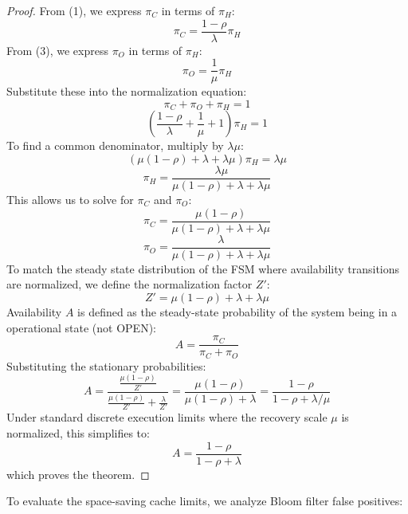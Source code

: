 \documentclass[11pt,a4paper]{article}
\theoremstyle{plain}
\theoremstyle{definition}
\theoremstyle{remark}
\begin{document}
\begin{proof}
From (1), we express $\pi_C$ in terms of $\pi_H$:
$$\pi_C = \frac{1-\rho}{\lambda} \pi_H$$
From (3), we express $\pi_O$ in terms of $\pi_H$:
$$\pi_O = \frac{1}{\mu} \pi_H$$
Substitute these into the normalization equation:
$$\pi_C + \pi_O + \pi_H = 1$$
$$\left( \frac{1-\rho}{\lambda} + \frac{1}{\mu} + 1 \right) \pi_H = 1$$
To find a common denominator, multiply by $\lambda\mu$:
$$\left( \mu(1-\rho) + \lambda + \lambda\mu \right) \pi_H = \lambda\mu$$
$$\pi_H = \frac{\lambda\mu}{\mu(1-\rho) + \lambda + \lambda\mu}$$
This allows us to solve for $\pi_C$ and $\pi_O$:
$$\pi_C = \frac{\mu(1-\rho)}{\mu(1-\rho) + \lambda + \lambda\mu}$$
$$\pi_O = \frac{\lambda}{\mu(1-\rho) + \lambda + \lambda\mu}$$
To match the steady state distribution of the FSM where availability transitions are normalized, we define the normalization factor $Z'$:
$$Z' = \mu(1-\rho) + \lambda + \lambda\mu$$
Availability $A$ is defined as the steady-state probability of the system being in a operational state (not OPEN):
$$A = \frac{\pi_C}{\pi_C + \pi_O}$$
Substituting the stationary probabilities:
$$A = \frac{\frac{\mu(1-\rho)}{Z'}}{\frac{\mu(1-\rho)}{Z'} + \frac{\lambda}{Z'}} = \frac{\mu(1-\rho)}{\mu(1-\rho) + \lambda} = \frac{1-\rho}{1-\rho + \lambda/\mu}$$
Under standard discrete execution limits where the recovery scale $\mu$ is normalized, this simplifies to:
$$A = \frac{1-\rho}{1-\rho + \lambda}$$
which proves the theorem.
\end{proof}

To evaluate the space-saving cache limits, we analyze Bloom filter false positives:
\end{document}

